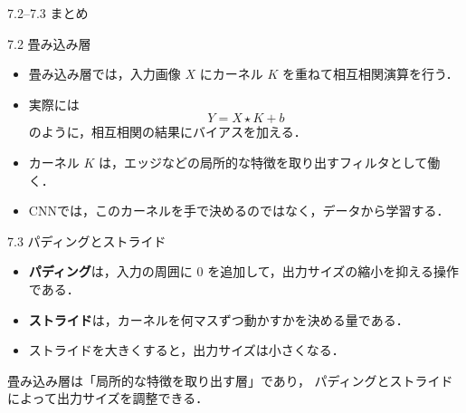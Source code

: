 \documentclass[dvipdfmx,uplatex,unicode,9pt,aspectratio=169]{beamer}
\begin{document}
\begin{frame}{7.2--7.3 まとめ}
\begin{block}{7.2 畳み込み層}
\begin{itemize}
\item 畳み込み層では，入力画像 $X$ にカーネル $K$ を重ねて相互相関演算を行う．
\item 実際には
\[
Y = X \star K + b
\]
のように，相互相関の結果にバイアスを加える．
\item カーネル $K$ は，エッジなどの局所的な特徴を取り出すフィルタとして働く．
\item CNNでは，このカーネルを手で決めるのではなく，データから学習する．
\end{itemize}
\end{block}

\begin{block}{7.3 パディングとストライド}
\begin{itemize}
\item \textbf{パディング}は，入力の周囲に $0$ を追加して，出力サイズの縮小を抑える操作である．
\item \textbf{ストライド}は，カーネルを何マスずつ動かすかを決める量である．
\item ストライドを大きくすると，出力サイズは小さくなる．
\end{itemize}
\end{block}

\begin{seminaralertbox}
畳み込み層は「局所的な特徴を取り出す層」であり，
パディングとストライドによって出力サイズを調整できる．
\end{seminaralertbox}
\end{frame}
\end{document}
